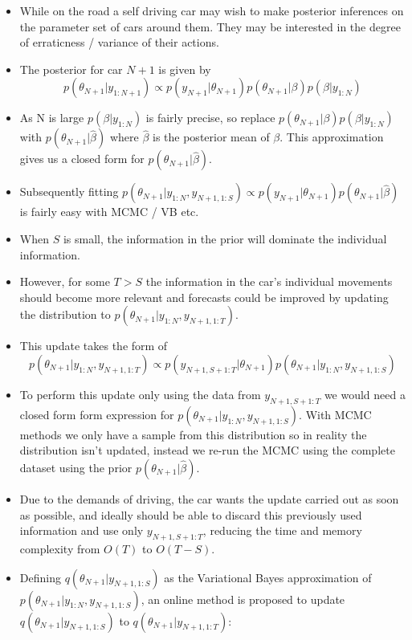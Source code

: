 \documentclass[12pt,a4paper]{article}\usepackage[]{graphicx}\usepackage[]{color}
\begin{document}
\begin{itemize}
\item While on the road a self driving car may wish to make posterior inferences on the parameter set of cars around them. They may be interested in the degree of erraticness / variance of their actions.
\item The posterior for car $N+1$ is given by 
\begin{equation}
p(\theta_{N+1} | y_{1:N+1}) \propto p(y_{N+1} | \theta_{N+1}) p(\theta_{N+1} | \beta) p (\beta | y_{1:N})
\end{equation}
\item As N is large $p (\beta | y_{1:N})$ is fairly precise, so replace $ p(\theta_{N+1} | \beta) p (\beta | y_{1:N})$ with $ p(\theta_{N+1} | \hat{\beta})$ where $\hat{\beta}$ is the posterior mean of $\beta$. This approximation gives us a closed form for $ p(\theta_{N+1} | \hat{\beta})$.
\item Subsequently fitting $p(\theta_{N+1} | y_{1:N}, y_{N+1, 1:S})  \propto p(y_{N+1} | \theta_{N+1}) p(\theta_{N+1} | \hat{\beta})$ is fairly easy with MCMC / VB etc.
\item When $S$ is small, the information in the prior will dominate the individual information.
\item However, for some $T > S$ the information in the car's individual movements should become more relevant and forecasts could be improved by updating the distribution to $p(\theta_{N+1} | y_{1:N}, y_{N+1, 1:T})$.
\item This update takes the form of
\begin{equation}
p(\theta_{N+1} | y_{1:N}, y_{N+1, 1:T}) \propto p(y_{N+1, S+1:T} | \theta_{N+1}) p(\theta_{N+1} | y_{1:N}, y_{N+1, 1:S})
\end{equation}
\item To perform this update only using the data from $y_{N+1, S+1:T}$ we would need a closed form form expression for $p(\theta_{N+1} | y_{1:N}, y_{N+1, 1:S})$. With MCMC methods we only have a sample from this distribution so in reality the distribution isn't updated, instead we re-run the MCMC using the complete dataset using the prior $p(\theta_{N+1} | \hat{\beta})$.
\item Due to the demands of driving, the car wants the update carried out as soon as possible, and ideally should be able to discard this previously used information and use only $y_{N+1, S+1:T}$, reducing the time and memory complexity from $O(T)$ to $O(T-S)$. 
\item Defining $q(\theta_{N+1} | y_{N+1, 1:S})$ as the Variational Bayes approximation of $p(\theta_{N+1} | y_{1:N}, y_{N+1, 1:S})$, an online method is proposed to update $q(\theta_{N+1} | y_{N+1, 1:S})$ to $q(\theta_{N+1} | y_{N+1, 1:T})$:

\end{itemize}
\end{document}
